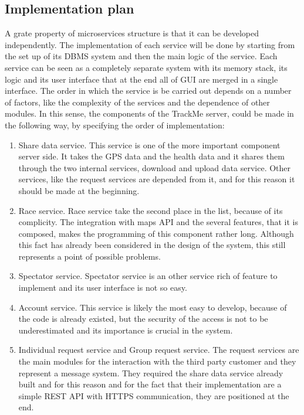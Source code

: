 \subsection{Implementation plan}
A grate property of microservices structure is that it can be developed independently. The implementation of each service will be done by starting from the set up of its DBMS system and then the main logic of the service. Each service can be seen as a completely separate system with its memory stack, its logic and its user interface that at the end all of GUI are merged in a single interface. The order in which the service is be carried out depends on a number of factors, like the complexity of the services and the dependence of other modules. In this sense, the components of the TrackMe server, could be made in the following way, by specifying the order of implementation:
\begin{enumerate}
\item Share data service.
This service is one of the more important component server side. It takes the GPS data and the health data and it shares them through the two internal services, download and upload data service. Other services, like the request services are depended from it, and for this reason it should be made at the beginning.
\item Race service.
Race service take the second place in the list, because of its complicity. The integration with maps API and the several features, that it is composed, makes the programming of this component rather long. Although this fact has already been considered in the design of the system, this still represents a point of possible problems.
\item Spectator service.
Spectator service is an other service rich of feature to implement and its user interface is not so easy.  
\item Account service.
This service is likely the most easy to develop, because of the code is already existed, but the security of the access is not to be underestimated and its importance is crucial in the system. 
\item Individual request service and Group request service.
The request services are the main modules for the interaction with the third party customer and they represent a message system. They required the share data service already built and for this reason and for the fact that their implementation are a simple REST API with HTTPS communication, they are positioned at the end.
\end{enumerate}   
